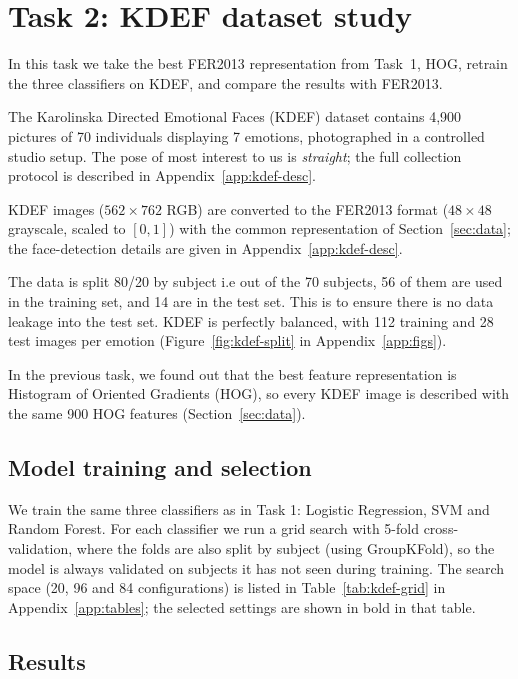 \section{Task 2: KDEF dataset study}
\label{sec:task2}

In this task we take the best FER2013 representation from Task~1, HOG, retrain the three classifiers on KDEF, and compare the results with FER2013.

The Karolinska Directed Emotional Faces (KDEF) dataset contains 4,900 pictures of 70 individuals displaying 7 emotions, photographed in a controlled studio setup. The pose of most interest to us is \textit{straight}; the full collection protocol is described in Appendix~\ref{app:kdef-desc}.

KDEF images ($562\times762$ RGB) are converted to the FER2013 format ($48\times48$ grayscale, scaled to $[0,1]$) with the common representation of Section~\ref{sec:data}; the face-detection details are given in Appendix~\ref{app:kdef-desc}.

The data is split 80/20 by subject i.e out of the 70 subjects, 56 of them are used in the training set, and 14 are in the test set.  This is to ensure there is no data leakage into the test set. KDEF is perfectly balanced, with 112 training and 28 test images per emotion (Figure~\ref{fig:kdef-split} in Appendix~\ref{app:figs}).

In the previous task, we found out that the best feature representation is Histogram of Oriented Gradients (HOG), so every KDEF image is described with the same 900 HOG features (Section~\ref{sec:data}).


\subsection{Model training and selection}

We train the same three classifiers as in Task 1: Logistic Regression, SVM and Random Forest. For each classifier we run a grid search with 5-fold cross-validation, where the folds are also split by subject (using GroupKFold), so the model is always validated on subjects it has not seen during training. The search space (20, 96 and 84 configurations) is listed in Table~\ref{tab:kdef-grid} in Appendix~\ref{app:tables}; the selected settings are shown in bold in that table.


\subsection{Results}

